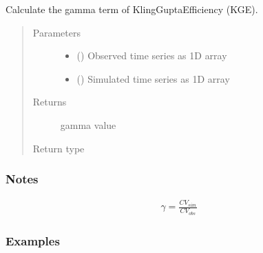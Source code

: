 \documentclass[letterpaper,10pt,english]{sphinxmanual}
\begin{document}
\begin{fulllineitems}
\label{\detokenize{reference/kge:de.kge.calc_kge_gamma}}
Calculate the gamma term of Kling\sphinxhyphen{}Gupta\sphinxhyphen{}Efficiency (KGE).
\begin{quote}\begin{description}
\item[{Parameters}] \leavevmode\begin{itemize}
\item {} 
 (\sphinxstyleliteralemphasis{\sphinxupquote{(}}\sphinxstyleliteralemphasis{\sphinxupquote{,}}\sphinxstyleliteralemphasis{\sphinxupquote{)}}) \textendash{} Observed time series as 1\sphinxhyphen{}D array

\item {} 
 (\sphinxstyleliteralemphasis{\sphinxupquote{(}}\sphinxstyleliteralemphasis{\sphinxupquote{,}}\sphinxstyleliteralemphasis{\sphinxupquote{)}}) \textendash{} Simulated time series as 1\sphinxhyphen{}D array

\end{itemize}

\item[{Returns}] \leavevmode
{} \textendash{} gamma value

\item[{Return type}] \leavevmode
{}

\end{description}\end{quote}
\subsubsection*{Notes}
\begin{equation*}
\begin{split}\gamma = \frac{CV_{sim}}{CV_{obs}}\end{split}
\end{equation*}\subsubsection*{Examples}


\end{fulllineitems}
\end{document}
